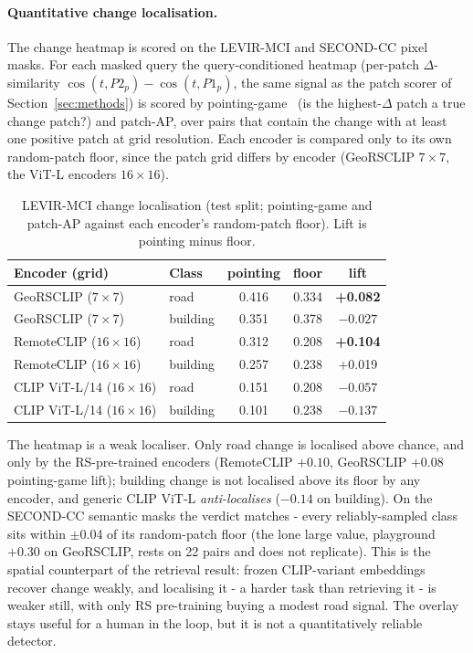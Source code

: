 \documentclass{article}
\begin{document}
\paragraph{Quantitative change localisation.}
\label{sec:localization}
The change heatmap is scored on the LEVIR-MCI and SECOND-CC pixel masks. For each
masked query the query-conditioned heatmap (per-patch $\Delta$-similarity
$\cos(t,P2_p)-\cos(t,P1_p)$, the same signal as the patch scorer of
Section~\ref{sec:methods}) is scored by pointing-game~\cite{pointinggame} (is the
highest-$\Delta$ patch a true change patch?) and patch-AP, over pairs that
contain the change with at least one positive patch at grid resolution. Each
encoder is compared only to its own random-patch floor, since the patch grid
differs by encoder (GeoRSCLIP $7\times7$, the ViT-L encoders $16\times16$).

\begin{table}[H]
    \centering
    \caption{LEVIR-MCI change localisation (test split; pointing-game and patch-AP
    against each encoder's random-patch floor). Lift is pointing minus floor.}
    \label{tab:localization}
    \begin{tabular}{llccc}
        \toprule
        \textbf{Encoder (grid)} & \textbf{Class} & \textbf{pointing} & \textbf{floor} & \textbf{lift} \\
        \midrule
        GeoRSCLIP ($7\times7$)     & road     & 0.416 & 0.334 & \textbf{+0.082} \\
        GeoRSCLIP ($7\times7$)     & building & 0.351 & 0.378 & $-0.027$ \\
        RemoteCLIP ($16\times16$)  & road     & 0.312 & 0.208 & \textbf{+0.104} \\
        RemoteCLIP ($16\times16$)  & building & 0.257 & 0.238 & +0.019 \\
        CLIP ViT-L/14 ($16\times16$) & road     & 0.151 & 0.208 & $-0.057$ \\
        CLIP ViT-L/14 ($16\times16$) & building & 0.101 & 0.238 & $-0.137$ \\
        \bottomrule
    \end{tabular}
\end{table}

The heatmap is a weak localiser. Only road change is localised above chance, and
only by the RS-pre-trained encoders (RemoteCLIP $+0.10$, GeoRSCLIP $+0.08$
pointing-game lift); building change is not localised above its floor by any
encoder, and generic CLIP ViT-L \emph{anti-localises} ($-0.14$ on building). On
the SECOND-CC semantic masks the verdict matches - every reliably-sampled class
sits within $\pm$0.04 of its random-patch floor (the lone large value, playground
$+0.30$ on GeoRSCLIP, rests on 22 pairs and does not replicate). This is the
spatial counterpart of the retrieval result: frozen CLIP-variant embeddings
recover change weakly, and localising it - a harder task than retrieving it -
is weaker still, with only RS pre-training buying a modest road signal. The
overlay stays useful for a human in the loop, but it is not a quantitatively
reliable detector.
\end{document}
